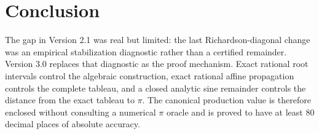\documentclass[11pt]{article}
\begin{document}
\section{Conclusion}

The gap in Version 2.1 was real but limited: the last Richardson-diagonal change was an empirical stabilization diagnostic rather than a certified remainder.  Version 3.0 replaces that diagnostic as the proof mechanism.  Exact rational root intervals control the algebraic construction, exact rational affine propagation controls the complete tableau, and a closed analytic sine remainder controls the distance from the exact tableau to $\pi$.  The canonical production value is therefore enclosed without consulting a numerical $\pi$ oracle and is proved to have at least 80 decimal places of absolute accuracy.

\appendix
\end{document}
